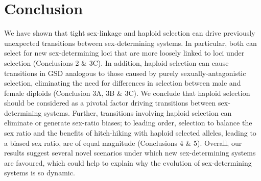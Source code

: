 \documentclass[10pt,letterpaper]{article}
\providecommand{\DIFdelbegin}{} %
\providecommand{\DIFdelend}{} %
\begin{document}
\DIFdelbegin %

\DIFdelend %
\section*{Conclusion}

We have shown that tight sex-linkage and haploid selection can drive previously unexpected transitions between sex-determining systems.
In particular, both can select for new sex-determining loci that are more loosely linked to loci under selection (Conclusions 2 \& 3C). 
In addition, haploid selection can cause transitions in GSD analogous to those caused by purely sexually-antagonistic selection, eliminating the need for differences in selection between male and female diploids (Conclusion 3A, 3B \& 3C).
We conclude that haploid selection should be considered as a pivotal factor driving transitions between sex-determining systems. 
Further, transitions involving haploid selection can eliminate or generate sex-ratio biases; to leading order, selection to balance the sex ratio and the benefits of hitch-hiking with haploid selected alleles, leading to a biased sex ratio, are of equal magnitude (Conclusions 4 \& 5). 
Overall, our results suggest several novel scenarios under which new sex-determining systems are favoured, which could help to explain why the evolution of sex-determining systems is so dynamic. 
\end{document}
